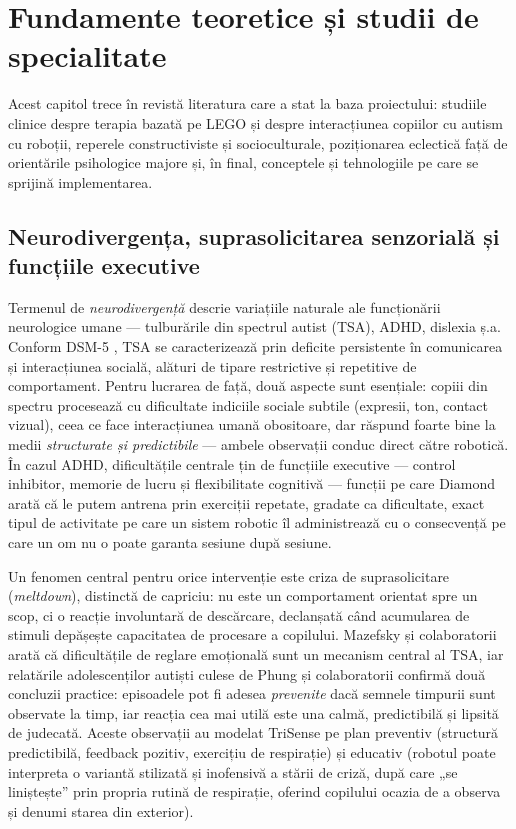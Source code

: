 \chapter{Fundamente teoretice și studii de specialitate}
\label{cap:preliminarii}

Acest capitol trece în revistă literatura care a stat la baza proiectului: studiile clinice despre terapia bazată pe LEGO și despre interacțiunea copiilor cu autism cu roboții, reperele constructiviste și socioculturale, poziționarea eclectică față de orientările psihologice majore și, în final, conceptele și tehnologiile pe care se sprijină implementarea.

\section{Neurodivergența, suprasolicitarea senzorială și funcțiile executive}
\label{sec:meltdown}

Termenul de \emph{neurodivergență} descrie variațiile naturale ale funcționării neurologice umane — tulburările din spectrul autist (TSA), ADHD, dislexia ș.a. Conform DSM-5 \cite{apa2013}, TSA se caracterizează prin deficite persistente în comunicarea și interacțiunea socială, alături de tipare restrictive și repetitive de comportament. Pentru lucrarea de față, două aspecte sunt esențiale: copiii din spectru procesează cu dificultate indiciile sociale subtile (expresii, ton, contact vizual), ceea ce face interacțiunea umană obositoare, dar răspund foarte bine la medii \emph{structurate și predictibile} — ambele observații conduc direct către robotică. În cazul ADHD, dificultățile centrale țin de funcțiile executive — control inhibitor, memorie de lucru și flexibilitate cognitivă \cite{diamond2013} — funcții pe care Diamond arată că le putem antrena prin exerciții repetate, gradate ca dificultate, exact tipul de activitate pe care un sistem robotic îl administrează cu o consecvență pe care un om nu o poate garanta sesiune după sesiune.

Un fenomen central pentru orice intervenție este criza de suprasolicitare (\emph{meltdown}), distinctă de capriciu: nu este un comportament orientat spre un scop, ci o reacție involuntară de descărcare, declanșată când acumularea de stimuli depășește capacitatea de procesare a copilului. Mazefsky și colaboratorii \cite{mazefsky2013} arată că dificultățile de reglare emoțională sunt un mecanism central al TSA, iar relatările adolescenților autiști culese de Phung și colaboratorii \cite{phung2021} confirmă două concluzii practice: episoadele pot fi adesea \emph{prevenite} dacă semnele timpurii sunt observate la timp, iar reacția cea mai utilă este una calmă, predictibilă și lipsită de judecată. Aceste observații au modelat TriSense pe plan preventiv (structură predictibilă, feedback pozitiv, exercițiu de respirație) și educativ (robotul poate interpreta o variantă stilizată și inofensivă a stării de criză, după care „se liniștește” prin propria rutină de respirație, oferind copilului ocazia de a observa și denumi starea din exterior).

